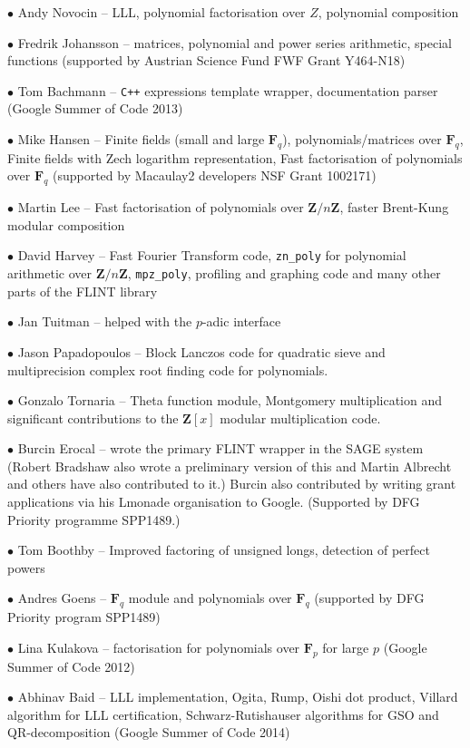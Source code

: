 \documentclass[a4paper,10pt]{book}
\newcommand{\Z}{\mathbf{Z}}%
\newcommand{\F}{\mathbf{F}}%
\newcommand{\code}{\lstinline}
\begin{document}
$\bullet$ Andy Novocin -- LLL, polynomial factorisation over $Z$, polynomial
composition

$\bullet$ Fredrik Johansson -- matrices, polynomial and power series
arithmetic, special functions (supported by Austrian Science Fund FWF Grant
Y464-N18)

$\bullet$ Tom Bachmann -- \code{C++} expressions template wrapper,
documentation parser (Google Summer of Code 2013)

$\bullet$ Mike Hansen -- Finite fields (small and large $\F_q$),
polynomials/matrices over $\F_q$, Finite fields with Zech logarithm
representation, Fast factorisation of polynomials over $\F_q$ (supported by
Macaulay2 developers NSF Grant 1002171)

$\bullet$ Martin Lee -- Fast factorisation of polynomials over $\Z/n\Z$,
faster Brent-Kung modular composition

$\bullet$ David Harvey -- Fast Fourier Transform code, \code{zn_poly} for
polynomial arithmetic over $\Z/n\Z$, \code{mpz_poly}, profiling and
graphing code and many other parts of the FLINT library

$\bullet$ Jan Tuitman -- helped with the $p$-adic interface

$\bullet$ Jason Papadopoulos -- Block Lanczos code for quadratic sieve and
multiprecision complex root finding code for polynomials.

$\bullet$ Gonzalo Tornaria -- Theta function module, Montgomery multiplication
and significant contributions to the $\Z[x]$ modular multiplication code.

$\bullet$ Burcin Erocal -- wrote the primary FLINT wrapper in the SAGE system
(Robert Bradshaw also wrote a preliminary version of this and Martin Albrecht
and others have also contributed to it.)  Burcin also contributed by writing
grant applications via his Lmonade organisation to Google. (Supported by DFG
Priority programme SPP1489.)

$\bullet$ Tom Boothby -- Improved factoring of unsigned longs, detection of
perfect powers

$\bullet$ Andres Goens -- $\F_q$ module and polynomials over $\F_q$ (supported
by DFG Priority program SPP1489)

$\bullet$ Lina Kulakova --  factorisation for polynomials over $\F_p$ for large
$p$ (Google Summer of Code 2012)

$\bullet$ Abhinav Baid -- LLL implementation, Ogita, Rump, Oishi dot product,
Villard algorithm for LLL certification, Schwarz-Rutishauser algorithms for GSO and QR-decomposition (Google Summer of Code 2014)
\end{document}
